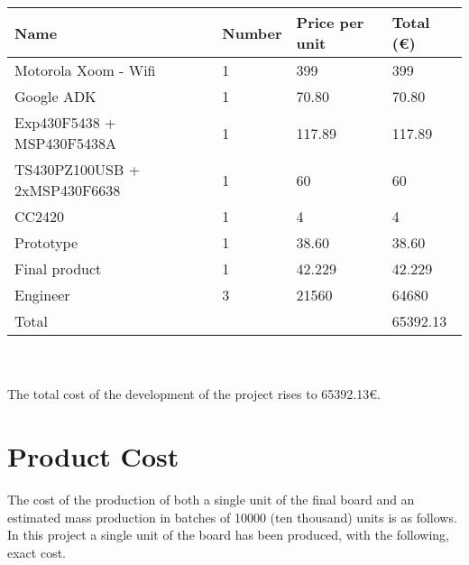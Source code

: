 \begin{tabular}{| p{5cm} |l | l | l |} 
\hline
   Name & Number& Price per unit & Total ({\small \euro})\\ \hline
   Motorola Xoom - Wifi & 1 & 399 & 399\\ \hline
   Google ADK & 1 & 70.80 & 70.80\\ \hline
   Exp430F5438 + MSP430F5438A & 1 & 117.89 & 117.89\\ \hline
   TS430PZ100USB + 2xMSP430F6638 & 1 & 60 & 60\\ \hline
   CC2420 & 1 & 4 & 4\\ \hline
   Prototype & 1 & 38.60 & 38.60\\ \hline
   Final product & 1 & 42.229 & 42.229\\ \hline
   Engineer & 3 & 21560 & 64680\\ \hline
   Total & & & 65392.13\\ \hline
\end{tabular}\\\\

	The total cost of the development of the project rises to 65392.13{\small \euro}. 

\chapter{Product Cost}
\label{ch:cost}

	The cost of the production of both a single unit of the final board and an estimated mass production in batches of 10000 (ten thousand) units is as follows.\\

	In this project a single unit of the board has been produced, with the following, exact cost.\\


